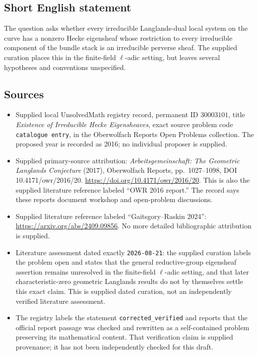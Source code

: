 \documentclass[11pt]{article}
\begin{document}
\subsection{Short English statement}
The question asks whether every irreducible Langlands-dual local system on the curve has a nonzero Hecke eigensheaf whose restriction to every irreducible component of the bundle stack is an irreducible perverse sheaf. The supplied curation places this in the finite-field \(\ell\)-adic setting, but leaves several hypotheses and conventions unspecified.
\subsection{Sources}
\begin{itemize}
\item Supplied local UnsolvedMath registry record, permanent ID \(30003101\), title \emph{Existence of Irreducible Hecke Eigensheaves}, exact source problem code \texttt{catalogue entry}, in the Oberwolfach Reports Open Problems collection. The proposed year is recorded as 2016; no individual proposer is supplied.
\item Supplied primary-source attribution: \emph{Arbeitsgemeinschaft: The Geometric Langlands Conjecture} (2017), Oberwolfach Reports, pp.~1027--1098, DOI 10.4171/owr/2016/20. \url{https://doi.org/10.4171/owr/2016/20}. This is also the supplied literature reference labeled ``OWR 2016 report.'' The record says these reports document workshop and open-problem discussions.
\item Supplied literature reference labeled ``Gaitsgory--Raskin 2024'': \url{https://arxiv.org/abs/2409.09856}. No more detailed bibliographic attribution is supplied.
\item Literature assessment dated exactly \texttt{2026-08-21}: the supplied curation labels the problem open and states that the general reductive-group eigensheaf assertion remains unresolved in the finite-field \(\ell\)-adic setting, and that later characteristic-zero geometric Langlands results do not by themselves settle this exact claim. This is supplied dated curation, not an independently verified literature assessment.
\item The registry labels the statement \texttt{corrected\_verified} and reports that the official report passage was checked and rewritten as a self-contained problem preserving its mathematical content. That verification claim is supplied provenance; it has not been independently checked for this draft.
\end{itemize}
\end{document}
